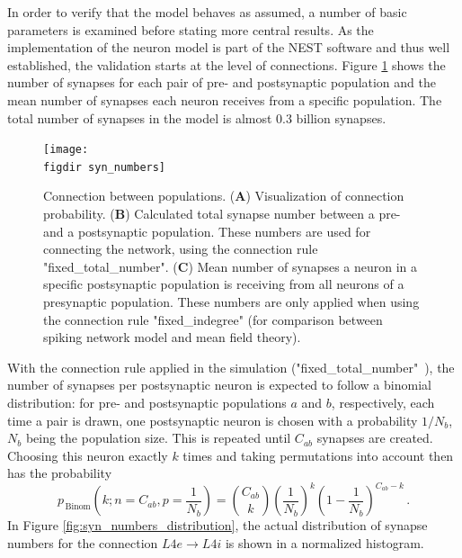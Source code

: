 In order to verify that the model behaves as assumed, a number of basic parameters 
is examined before stating more central results. As the implementation of the neuron model
is part of the NEST software and thus well established, the validation starts at the level 
of connections. Figure \ref{fig:syn_numbers} shows the number of synapses for each pair 
of pre- and postsynaptic population and 
the mean number of synapses each neuron receives from a specific population. The total number 
of synapses in the model is almost 0.3 billion synapses.  
\begin{figure}[htpb]
    \centering
    \texttt{[image: \\figdir syn\_numbers]}
    \caption{
        Connection between populations. (\textbf{A}) Visualization of 
        connection probability. (\textbf{B}) Calculated total synapse number between a pre- 
        and a postsynaptic population. These numbers are used for connecting the network, 
        using the connection rule "fixed\_total\_number". (\textbf{C}) Mean number of synapses
        a neuron in a specific postsynaptic population is receiving from all neurons of a 
        presynaptic population. These numbers are only applied when using the connection
        rule "fixed\_indegree" (for comparison between spiking network model and mean field theory).
    }
    \label{fig:syn_numbers}
\end{figure}
With the connection rule applied in the simulation ("fixed\_total\_number"~\cite{NEST}),
the number of synapses per postsynaptic neuron is expected to follow a binomial distribution:
for pre- and postsynaptic populations $a$ and $b$, respectively, 
each time a pair is drawn, one postsynaptic neuron is chosen with a probability 
$1 / N_b$, $N_b$ being the population size. This is repeated until $C_{ab}$ synapses are
created. 
Choosing this neuron exactly $k$ times and taking 
permutations into account then has the probability
\begin{equation}
    p_{\,\text{Binom}}\left(k; n=C_{ab}, p=\frac{1}{N_b}\right) = 
        {C_{ab}\choose{k}} 
        \left( \frac{1}{N_b} \right)^{k} 
        \left( 1 - \frac{1}{N_b} \right)^{C_{ab} - k} \,.
    \label{eq:binomial}
\end{equation}
In Figure \ref{fig:syn_numbers_distribution}, the actual distribution of synapse numbers 
for the connection $L4e \to L4i$ is shown in a normalized histogram. 
